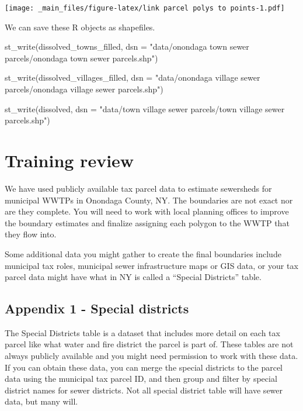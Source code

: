 \documentclass[
]{book}
\newenvironment{Shaded}{\begin{snugshade}}{\end{snugshade}}
\newcommand{\AttributeTok}[1]{\textcolor[rgb]{0.77,0.63,0.00}{#1}}
\newcommand{\FunctionTok}[1]{\textcolor[rgb]{0.00,0.00,0.00}{#1}}
\newcommand{\NormalTok}[1]{#1}
\newcommand{\StringTok}[1]{\textcolor[rgb]{0.31,0.60,0.02}{#1}}
\begin{document}
\texttt{[image: \_main\_files/figure-latex/link parcel polys to points-1.pdf]}

We can save these R objects as shapefiles.

\begin{Shaded}
\begin{Highlighting}[]
\FunctionTok{st\_write}\NormalTok{(dissolved\_towns\_filled, }
         \AttributeTok{dsn =} \StringTok{"data/onondaga town sewer parcels/onondaga town sewer parcels.shp"}\NormalTok{)}

\FunctionTok{st\_write}\NormalTok{(dissolved\_villages\_filled, }
         \AttributeTok{dsn =} \StringTok{"data/onondaga village sewer parcels/onondaga village sewer parcels.shp"}\NormalTok{)}

\FunctionTok{st\_write}\NormalTok{(dissolved, }
         \AttributeTok{dsn =} \StringTok{"data/town village sewer parcels/town village sewer parcels.shp"}\NormalTok{)}
\end{Highlighting}
\end{Shaded}

\hypertarget{training-review}{%
\section{Training review}\label{training-review}}

We have used publicly available tax parcel data to estimate sewersheds for municipal WWTPs in Onondaga County, NY. The boundaries are not exact nor are they complete. You will need to work with local planning offices to improve the boundary estimates and finalize assigning each polygon to the WWTP that they flow into.

Some additional data you might gather to create the final boundaries include municipal tax roles, municipal sewer infrastructure maps or GIS data, or your tax parcel data might have what in NY is called a ``Special Districts'' table.

\hypertarget{appendix-1---special-districts}{%
\subsection{Appendix 1 - Special districts}\label{appendix-1---special-districts}}

The Special Districts table is a dataset that includes more detail on each tax parcel like what water and fire district the parcel is part of. These tables are not always publicly available and you might need permission to work with these data. If you can obtain these data, you can merge the special districts to the parcel data using the municipal tax parcel ID, and then group and filter by special district names for sewer districts. Not all special district table will have sewer data, but many will.
\end{document}
